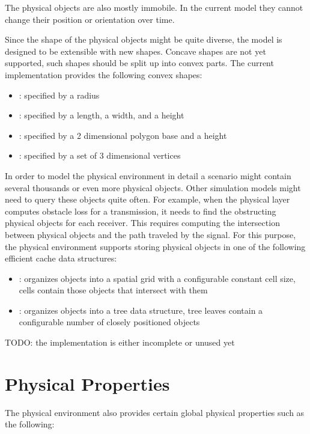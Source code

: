 The physical objects are also mostly immobile. In the current model they cannot
change their position or orientation over time.

Since the shape of the physical objects might be quite diverse, the model is
designed to be extensible with new shapes. Concave shapes are not yet supported,
such shapes should be split up into convex parts. The current implementation
provides the following convex shapes:

\begin{itemize}
  \item {}: specified by a radius 
  \item {}: specified by a length, a width, and a height
  \item {}: specified by a 2 dimensional polygon base and a height
  \item {}: specified by a set of 3 dimensional vertices
\end{itemize}

In order to model the physical environment in detail a scenario might contain
several thousands or even more physical objects. Other simulation models might
need to query these objects quite often. For example, when the physical layer
computes obstacle loss for a transmission, it needs to find the obstructing
physical objects for each receiver. This requires computing the intersection
between physical objects and the path traveled by the signal. For this purpose,
the physical environment supports storing physical objects in one of the
following efficient cache data structures:

\begin{itemize}
  \item {}: organizes objects into a spatial grid with
a configurable constant cell size, cells contain those objects that intersect
with them
  \item {}: organizes objects into a tree data structure,
tree leaves contain a configurable number of closely positioned objects
\end{itemize}

\iffalse TODO: the implementation is either incomplete or unused yet
\section{Physical Properties}

The physical environment also provides certain global physical properties such
as the following:

